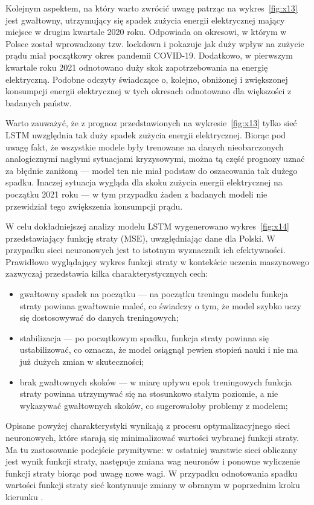 \documentclass[polish, twoside, 12pt, a4paper]{article}
\theoremstyle{definition}
\theoremstyle{plain}
\theoremstyle{remark}
\begin{document}
Kolejnym aspektem, na który warto zwrócić uwagę patrząc na wykres~\ref{fig:x13} jest gwałtowny, utrzymujący się spadek zużycia energii elektrycznej mający miejsce w drugim kwartale 2020 roku. Odpowiada on okresowi, w którym w Polsce został wprowadzony tzw. lockdown i pokazuje jak duży wpływ na zużycie prądu miał początkowy okres pandemii COVID-19. Dodatkowo, w pierwszym kwartale roku 2021 odnotowano duży skok zapotrzebowania na energię elektryczną. Podobne odczyty świadczące o, kolejno, obniżonej i zwiększonej konsumpcji energii elektrycznej w tych okresach odnotowano dla większości z badanych państw. 

Warto zauważyć, że z prognoz przedstawionych na wykresie~\ref{fig:x13} tylko sieć LSTM uwzględnia tak duży spadek zużycia energii elektrycznej. Biorąc pod uwagę fakt, że wszystkie modele były trenowane na danych nieobarczonych analogicznymi nagłymi sytuacjami kryzysowymi, można tą część prognozy uznać za błędnie zaniżoną --- model ten nie miał podstaw do oszacowania tak dużego spadku. Inaczej sytuacja wygląda dla skoku zużycia energii elektrycznej na początku 2021 roku --- w tym przypadku żaden z badanych modeli nie przewidział tego zwiększenia konsumpcji prądu.

W celu dokładniejszej analizy modelu LSTM wygenerowano wykres~\ref{fig:x14} przedstawiający funkcję straty (MSE), uwzględniając dane dla Polski. W przypadku sieci neuronowych jest to istotnym wyznacznik ich efektywności. Prawidłowo wyglądający wykres funkcji straty w kontekście uczenia maszynowego zazwyczaj przedstawia kilka charakterystycznych cech:

\begin{itemize}[noitemsep]
	\item gwałtowny spadek na początku --- na początku treningu modelu funkcja straty powinna gwałtownie maleć, co świadczy o tym, że model szybko uczy się dostosowywać do danych treningowych;
	\item stabilizacja --- po początkowym spadku, funkcja straty powinna się ustabilizować, co oznacza, że model osiągnął pewien stopień nauki i nie ma już dużych zmian w skuteczności;
	\item brak gwałtownych skoków --- w miarę upływu epok treningowych funkcja straty powinna utrzymywać się na stosunkowo stałym poziomie, a nie wykazywać gwałtownych skoków, co sugerowałoby problemy z modelem;
\end{itemize}
Opisane powyżej charakterystyki wynikają z procesu optymalizacyjnego sieci neuronowych, które starają się minimalizować wartości wybranej funkcji straty. Ma tu zastosowanie podejście prymitywne: w ostatniej warstwie sieci obliczany jest wynik funkcji straty, następuje zmiana wag neuronów i ponowne wyliczenie funkcji straty biorąc pod uwagę nowe wagi. W przypadku odnotowania spadku wartości funkcji straty sieć kontynuuje zmiany w obranym w poprzednim kroku kierunku \citep{brzezinski2021}. 
\end{document}
